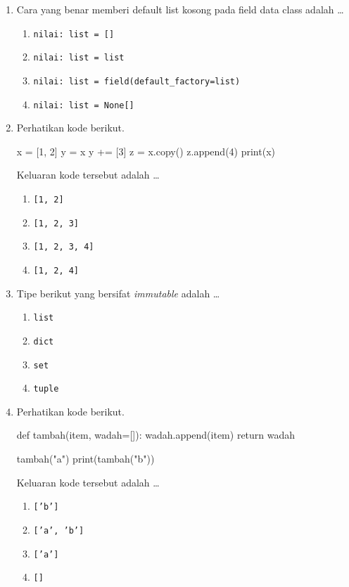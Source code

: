 \begin{enumerate}
  \item Cara yang benar memberi default list kosong pada field data class adalah \ldots
  \begin{enumerate}[label=\alph*.,itemsep=0pt]
    \item \texttt{nilai: list = []}
    \item \texttt{nilai: list = list}
    \item \texttt{nilai: list = field(default\_factory=list)}
    \item \texttt{nilai: list = None[]}
  \end{enumerate}

  \item Perhatikan kode berikut.
\begin{kode}[Soal 5]
x = [1, 2]
y = x
y += [3]
z = x.copy()
z.append(4)
print(x)
\end{kode}
  Keluaran kode tersebut adalah \ldots
  \begin{enumerate}[label=\alph*.,itemsep=0pt]
    \item \texttt{[1, 2]}
    \item \texttt{[1, 2, 3]}
    \item \texttt{[1, 2, 3, 4]}
    \item \texttt{[1, 2, 4]}
  \end{enumerate}

  \item Tipe berikut yang bersifat \emph{immutable} adalah \ldots
  \begin{enumerate}[label=\alph*.,itemsep=0pt]
    \item \texttt{list}
    \item \texttt{dict}
    \item \texttt{set}
    \item \texttt{tuple}
  \end{enumerate}

  \item Perhatikan kode berikut.
\begin{kode}[Soal 7]
def tambah(item, wadah=[]):
    wadah.append(item)
    return wadah

tambah("a")
print(tambah("b"))
\end{kode}
  Keluaran kode tersebut adalah \ldots
  \begin{enumerate}[label=\alph*.,itemsep=0pt]
    \item \texttt{['b']}
    \item \texttt{['a', 'b']}
    \item \texttt{['a']}
    \item \texttt{[]}
  \end{enumerate}


\end{enumerate}
